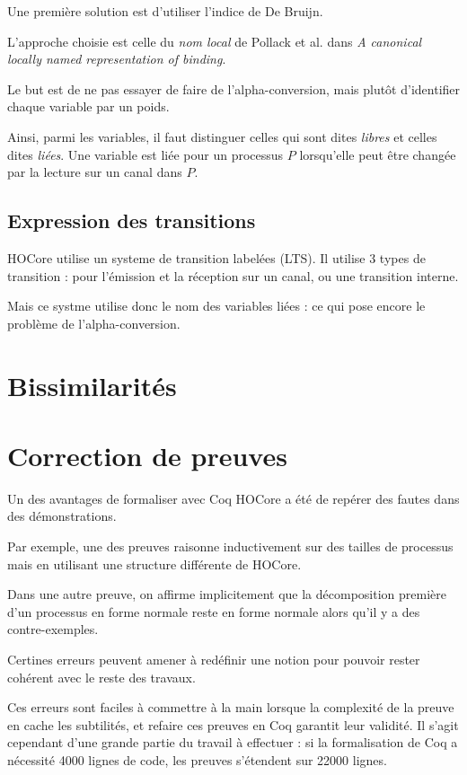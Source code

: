 \documentclass{article}
\begin{document}
Une première solution est d'utiliser l'indice de De Bruijn. %

L'approche choisie est celle du \textit{nom local} %
de Pollack et al. dans \textit{A canonical locally named representation of binding}.

Le but est de ne pas essayer de faire de l'alpha-conversion, mais plutôt d'identifier chaque variable par un poids.


Ainsi, parmi les variables, il faut distinguer celles qui sont dites \textit{libres} et celles dites \textit{liées}.
Une variable est liée pour un processus $P$ lorsqu'elle peut être changée par la lecture sur un canal dans $P$.



\subsection{Expression des transitions}
HOCore utilise un systeme de transition labelées (LTS). Il utilise 3 types de transition : pour l'émission et la réception sur un canal, ou une transition interne.

Mais ce systme utilise donc le nom des variables liées : ce qui pose encore le problème de l'alpha-conversion.


\section{Bissimilarités}


\section{Correction de preuves}
Un des avantages de formaliser avec Coq HOCore a été de repérer des fautes dans des démonstrations.

Par exemple, une des preuves raisonne inductivement sur des tailles de processus mais en utilisant une structure différente de HOCore.

Dans une autre preuve, on affirme implicitement que la décomposition première d'un processus en forme normale reste en forme normale alors qu'il y a des contre-exemples.

Certines erreurs peuvent amener à redéfinir une notion pour pouvoir rester cohérent avec le reste des travaux.

Ces erreurs sont faciles à commettre à la main lorsque la complexité de la preuve en cache les subtilités, et refaire ces preuves en Coq garantit leur validité. Il s'agit cependant d'une grande partie du travail à effectuer : si la formalisation de Coq a nécessité 4000 lignes de code, les preuves s'étendent sur 22000 lignes. 
\end{document}
